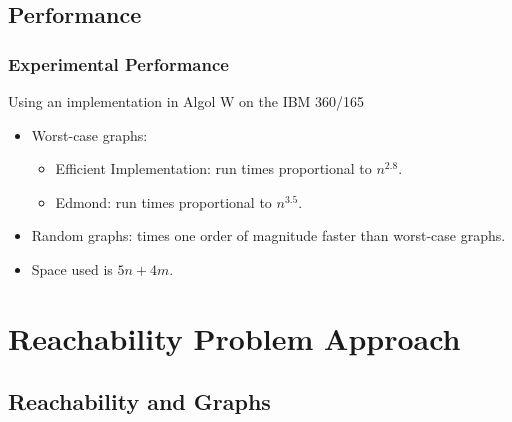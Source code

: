 \documentclass[pdftex]{beamer}
\newcommand{\subbullet}{\color{mypurple}\scriptsize\ding{235}}
\begin{document}
\subsection{Performance}

\begin{frame} \frametitle{Experimental Performance}
  Using an implementation in Algol W on the IBM 360/165
  \begin{itemize}
  \item Worst-case graphs:
    \begin{itemize}
    \item[\subbullet] Efficient Implementation: run times proportional to $n^{2.8}$.
    \item[\subbullet] Edmond: run times proportional to $n^{3.5}$.
    \end{itemize}

  \item Random graphs: times one order of magnitude faster than
    worst-case graphs.
  \item Space used is $5n + 4m$.
  \end{itemize}
\end{frame}


\section[Reachability Approach]{Reachability Problem Approach}

\subsection{Reachability and Graphs}
\end{document}
